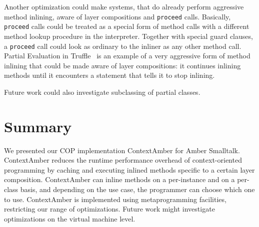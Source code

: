 \documentclass{sig-alternate}
\begin{document}
Another optimization could make systems, that do already perform aggressive method inlining, aware of layer compositions and \texttt{proceed} calls. Basically, \texttt{proceed} calls could be treated as a special form of method calls with a different method lookup procedure in the interpreter. Together with special guard clauses, a \texttt{proceed} call could look as ordinary to the inliner as any other method call. Partial Evaluation in Truffle~\cite{Wurthinger:2013:OVR:2509578.2509581} is an example of a very aggressive form of method inlining that could be made aware of layer compositions: it continues inlining methods until it encounters a statement that tells it to stop inlining.

Future work could also investigate subclassing of partial classes.

\section{Summary}
We presented our COP implementation ContextAmber for Amber Smalltalk. ContextAmber reduces the runtime performance overhead of context-oriented programming by caching and executing inlined methods specific to a certain layer composition. ContextAmber can inline methods on a per-instance and on a per-class basis, and depending on the use case, the programmer can choose which one to use. ContextAmber is implemented using metaprogramming facilities, restricting our range of optimizations.
Future work might investigate optimizations on the virtual machine level.

%

%
%
\balancecolumns
\end{document}
